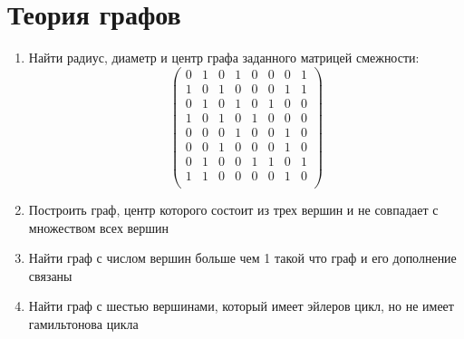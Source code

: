 \documentclass{paper}
\begin{document}
\section{Теория графов}
\begin{enumerate}
    \item Найти радиус, диаметр и центр графа заданного матрицей смежности:
    \[
        \begin{pmatrix}
            0 & 1 & 0 & 1 & 0 & 0 & 0 & 1\\
            1 & 0 & 1 & 0 & 0 & 0 & 1 & 1\\
            0 & 1 & 0 & 1 & 0 & 1 & 0 & 0\\
            1 & 0 & 1 & 0 & 1 & 0 & 0 & 0\\
            0 & 0 & 0 & 1 & 0 & 0 & 1 & 0\\
            0 & 0 & 1 & 0 & 0 & 0 & 1 & 0\\
            0 & 1 & 0 & 0 & 1 & 1 & 0 & 1\\
            1 & 1 & 0 & 0 & 0 & 0 & 1 & 0\\
        \end{pmatrix}
    \]
    \item Построить граф, центр которого состоит из трех вершин и не совпадает с множеством всех вершин
    \item Найти граф с числом вершин больше чем 1 такой что граф и его дополнение связаны
    \item Найти граф с шестью вершинами, который имеет эйлеров цикл, но не имеет гамильтонова цикла
\end{enumerate}
\end{document}
